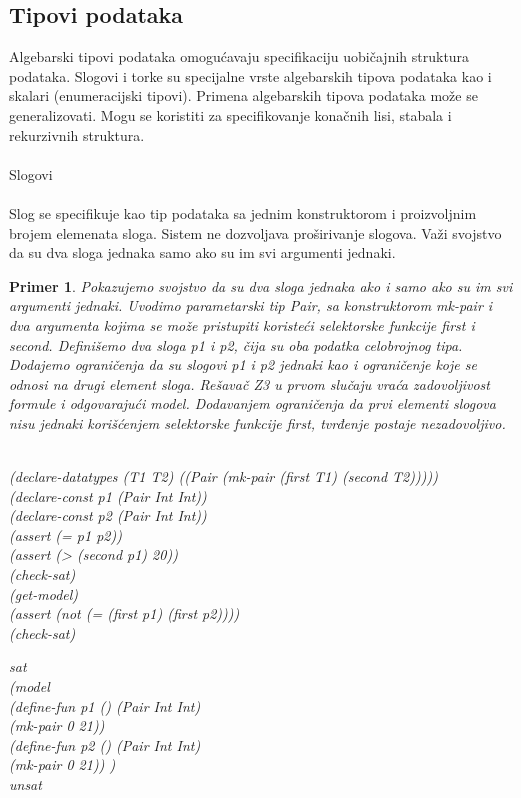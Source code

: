 \documentclass[12pt,oneside]{memoir}
\newtheorem{primer}{Primer}
\begin{document}
\subsection{Tipovi podataka}

Algebarski tipovi podataka omogućavaju specifikaciju uobičajnih struktura podataka. Slogovi i torke su specijalne vrste algebarskih tipova podataka kao i skalari (enumeracijski tipovi). Primena algebarskih tipova podataka može se generalizovati. Mogu se koristiti za specifikovanje konačnih lisi, stabala i rekurzivnih struktura. \\\\
Slogovi 
\\
\\
Slog se specifikuje kao tip podataka sa jednim konstruktorom i proizvoljnim brojem elemenata sloga. Sistem ne dozvoljava proširivanje slogova. Važi svojstvo da su dva sloga jednaka samo ako su im svi argumenti jednaki.
\\

\begin{primer} Pokazujemo svojstvo da su dva sloga jednaka ako i samo ako su im svi argumenti jednaki. Uvodimo parametarski tip Pair, sa konstruktorom mk-pair i dva argumenta kojima se može pristupiti koristeći selektorske funkcije first i second. Definišemo dva sloga p1 i p2, čija su oba podatka celobrojnog tipa. Dodajemo ograničenja da su slogovi p1 i p2 jednaki kao i ograničenje koje se odnosi na drugi element sloga. Rešavač Z3 u prvom slučaju vraća zadovoljivost formule i odgovarajući model. Dodavanjem ograničenja da prvi elementi slogova nisu jednaki korišćenjem selektorske funkcije first, tvrđenje postaje nezadovoljivo.
\\ \\
\begin{minipage}[b]{0.5\textwidth}
(declare-datatypes (T1 T2) ((Pair (mk-pair (first T1) (second T2)))))
\\(declare-const p1 (Pair Int Int))
\\(declare-const p2 (Pair Int Int))
\\(assert (= p1 p2))
\\(assert (> (second p1) 20))
\\(check-sat)
\\(get-model)
\\(assert (not (= (first p1) (first p2))))
\\(check-sat)
\end{minipage}
\hspace{2cm} 
\begin{minipage}[t]{0.5\textwidth}
\vspace{-6cm}
sat 
\\(model 
\\(define-fun p1 () (Pair Int Int) 
\\(mk-pair 0 21)) 
\\(define-fun p2 () (Pair Int Int) 
\\(mk-pair 0 21)) )
\\unsat
\end{minipage}

\end{primer}
\end{document}
